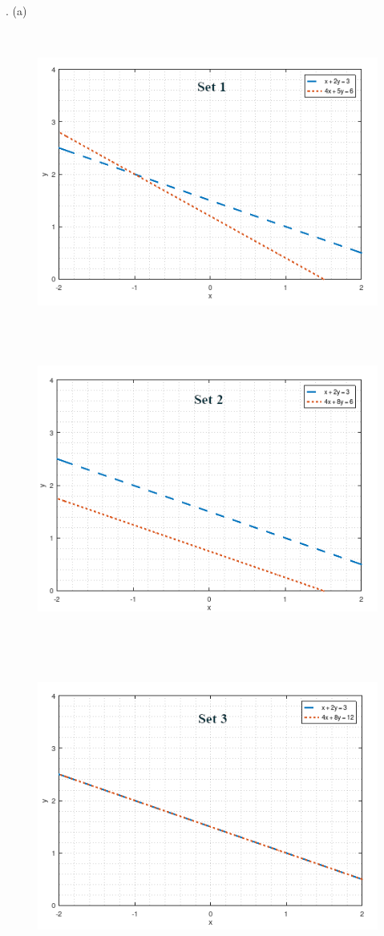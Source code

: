 \documentclass[12pt,letterpaper,fleqn]{article}
\theoremstyle{definition}
\begin{document}
.
(a)
	\begin{figure}[h!]
		\includegraphics[height=10cm]{4a1}
		\includegraphics[height=10cm]{4a2}
	\end{figure}
\newpage
	\begin{figure}[h!]
		\centering
		\includegraphics[height=10cm]{4a3}	
	\end{figure}
\end{document}
